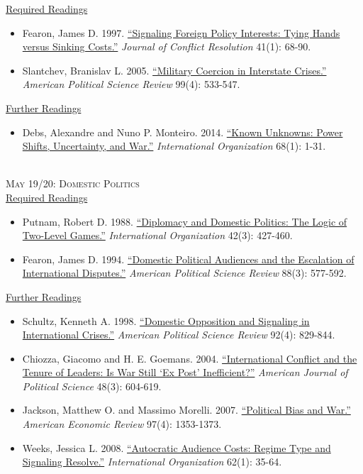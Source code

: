 \documentclass[11pt]{article}
\begin{document}
\noindent \underline{Required Readings}

\begin{itemize}
\item Fearon, James D. 1997. \href{http://jcr.sagepub.com/content/41/1/68.short}{``Signaling Foreign Policy Interests: Tying Hands versus Sinking Costs.''} \textit{Journal of Conflict Resolution} 41(1): 68-90.
\item Slantchev, Branislav L. 2005. \href{http://www.jstor.org/stable/30038963}{``Military Coercion in Interstate Crises.''} \textit{American Political Science Review} 99(4): 533-547.
\end{itemize}

\noindent \underline{Further Readings}

\begin{itemize}
\item Debs, Alexandre and Nuno P. Monteiro. 2014. \href{http://dx.doi.org/10.1017/S0020818313000192}{``Known Unknowns: Power Shifts, Uncertainty, and War.''} \textit{International Organization} 68(1): 1-31.
\end{itemize}

~\\
\noindent \textsc{May 19/20: Domestic Politics} \\

\noindent \underline{Required Readings}

\begin{itemize}
\item Putnam, Robert D. 1988. \href{http://www.jstor.org/stable/2706785}{``Diplomacy and Domestic Politics: The Logic of Two-Level Games.''} \textit{International Organization} 42(3): 427-460.
\item Fearon, James D. 1994. \href{http://www.jstor.org/stable/2944796}{``Domestic Political Audiences and the Escalation of International Disputes.''} \textit{American Political Science Review} 88(3): 577-592.
\end{itemize}

\noindent \underline{Further Readings}

\begin{itemize}
\item Schultz, Kenneth A. 1998. \href{http://www.jstor.org/stable/2586306}{``Domestic Opposition and Signaling in International Crises.''} \textit{American Political Science Review} 92(4): 829-844.
\item Chiozza, Giacomo and H. E. Goemans. 2004. \href{http://www.jstor.org/stable/1519919}{``International Conflict and the Tenure of Leaders: Is War Still `Ex Post' Inefficient?''} \textit{American Journal of Political Science} 48(3): 604-619.
\item Jackson, Matthew O. and Massimo Morelli. 2007. \href{http://www.jstor.org/stable/30034096}{``Political Bias and War.''} \textit{American Economic Review} 97(4): 1353-1373.
\item Weeks, Jessica L. 2008. \href{http://www.jstor.org/stable/40071874}{``Autocratic Audience Costs: Regime Type and Signaling Resolve.''} \textit{International Organization} 62(1): 35-64.
\end{itemize}
\end{document}
